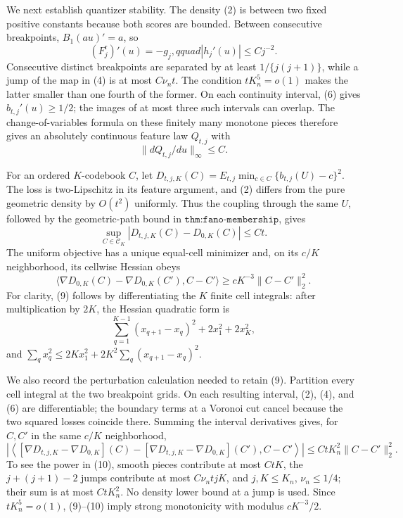 We next establish quantizer stability.  The density (2) is between two fixed positive constants because both scores are bounded.  Between consecutive breakpoints, \(B_1(au)'=a\), so
\[
 (F_j^{\mathrm r})'(u)=-g_j,qquad |h_j'(u)|\leq Cj^{-2}.                  \tag{6}
\]
Consecutive distinct breakpoints are separated by at least \(1/\{j(j+1)\}\), while a jump of the map in (4) is at most \(C\nu_nt\).  The condition \(tK_n^5=o(1)\) makes the latter smaller than one fourth of the former.  On each continuity interval, (6) gives \(b_{t,j}'(u)\geq1/2\); the images of at most three such intervals can overlap.  The change-of-variables formula on these finitely many monotone pieces therefore gives an absolutely continuous feature law \(Q_{t,j}\) with
\[
 \|dQ_{t,j}/du\|_\infty\leq C.                                          \tag{7}
\]

For an ordered \(K\)-codebook \(C\), let \(D_{t,j,K}(C)=E_{t,j}\min_{c\in C}\{b_{t,j}(U)-c\}^2\).  The loss is two-Lipschitz in its feature argument, and (2) differs from the pure geometric density by \(O(t^2)\) uniformly.  Thus the coupling through the same \(U\), followed by the geometric-path bound in \(\texttt{thm:fano-membership}\), gives
\[
 \sup_{C\in\mathcal C_K}|D_{t,j,K}(C)-D_{0,K}(C)|\leq Ct.                \tag{8}
\]
The uniform objective has a unique equal-cell minimizer and, on its \(c/K\) neighborhood, its cellwise Hessian obeys
\[
 \langle\nabla D_{0,K}(C)-\nabla D_{0,K}(C'),C-C'\rangle
 \geq cK^{-3}\|C-C'\|_2^2.                                              \tag{9}
\]
For clarity, (9) follows by differentiating the \(K\) finite cell integrals: after multiplication by \(2K\), the Hessian quadratic form is
\[
 \sum_{q=1}^{K-1}(x_{q+1}-x_q)^2+2x_1^2+2x_K^2,
\]
and \(\sum_qx_q^2\leq2Kx_1^2+2K^2\sum_q(x_{q+1}-x_q)^2\).

We also record the perturbation calculation needed to retain (9).  Partition every cell integral at the two breakpoint grids.  On each resulting interval, (2), (4), and (6) are differentiable; the boundary terms at a Voronoi cut cancel because the two squared losses coincide there.  Summing the interval derivatives gives, for \(C,C'\) in the same \(c/K\) neighborhood,
\[
 \left|\left\langle
 [\nabla D_{t,j,K}-\nabla D_{0,K}](C)
 -[\nabla D_{t,j,K}-\nabla D_{0,K}](C'),C-C'\right\rangle\right|
 \leq CtK_n^2\|C-C'\|_2^2.                                               \tag{10}
\]
To see the power in (10), smooth pieces contribute at most \(CtK\), the \(j+(j+1)-2\) jumps contribute at most \(C\nu_ntjK\), and \(j,K\leq K_n\), \(\nu_n\leq1/4\); their sum is at most \(CtK_n^2\).  No density lower bound at a jump is used.  Since \(tK_n^5=o(1)\), (9)--(10) imply strong monotonicity with modulus \(cK^{-3}/2\).

